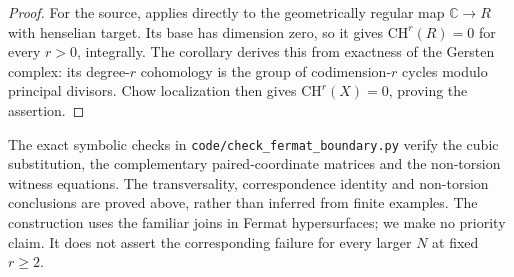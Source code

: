 \begin{proof}
For the source, \citet[Corollary~6.4(i), author p.~27]
{rootSkalit2017} applies directly to the geometrically regular
map $\mathbb C\to R$ with henselian target. Its base has
dimension zero, so it gives $\mathrm{CH}^r(R)=0$ for every
$r>0$, integrally. The corollary derives this from exactness of
the Gersten complex: its degree-$r$ cohomology is the group of
codimension-$r$ cycles modulo principal divisors. Chow localization then gives
$\mathrm{CH}^r(X)=0$, proving the assertion.
\end{proof}

The exact symbolic checks in
\texttt{code/check\_fermat\_boundary.py} verify the cubic
substitution, the complementary paired-coordinate matrices and
the non-torsion witness equations. The transversality,
correspondence identity and non-torsion conclusions are proved
above, rather than inferred from finite examples. The construction
uses the familiar joins in Fermat hypersurfaces; we make no
priority claim. It does not assert the corresponding failure
for every larger $N$ at fixed $r\ge2$.
